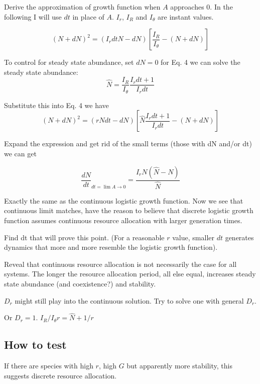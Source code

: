 \documentclass[12pt]{article}
\begin{document}
Derive the approximation of growth function when $A$ approaches 0. In the following I will use $dt$ in place of $A$. $I_r$, $I_R$ and $I_\theta$ are instant values.

\begin{equation}
(N + dN)^2 = (I_r dt N  - dN) [\frac{I_R}{I_\theta} - (N+dN)]
\end{equation}

To control for steady state abundance, set $dN=0$ for Eq. 4 we can solve the steady state abundance: 
\begin{equation}
\hat{N} = \frac{I_R}{I_\theta} \frac{I_r dt+1}{I_r dt} 
\end{equation}

Substitute this into Eq. 4 we have
\begin{equation}
(N + dN)^2 = (rN dt - dN) [\hat{N} \frac{I_r dt+1}{I_r dt} - (N+dN)]
\end{equation}

Expand the expression and get rid of the small terms (those with dN and/or dt) we can get

\begin{equation}
\frac{dN}{dt}_{dt = \lim{A \to 0}} = \frac{I_rN (\hat{N}-N)}{\hat{N}}
\end{equation}

Exactly the same as the continuous logistic growth function. Now we see that continuous limit matches, have the reason to believe that discrete logistic growth function assumes continuous resource allocation with larger generation times.

Find dt that will prove this point. (For a reasonable $r$ value, smaller $dt$ generates dynamics that more and more resemble the logistic growth function).

Reveal that continuous resource allocation is not necessarily the case for all systems. The longer the resource allocation period, all else equal, increases steady state abundance (and coexistence?) and stability.

$D_r$ might still play into the continuous solution. Try to solve one with general $D_r$.

Or $D_r=1$. $I_R/I_\theta r = \hat{N} + 1/r$



\subsection{How to test}
If there are species with high $r$, high $G$ but apparently more stability, this suggests discrete resource allocation. 
\end{document}
